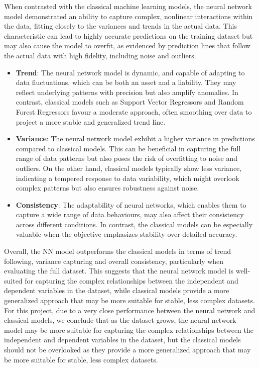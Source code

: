 When contrasted with the classical machine learning models, the neural network model demonstrated an ability to capture complex, nonlinear interactions within the data, fitting closely to the 
variances and trends in the actual data. This characteristic can lead to highly accurate predictions on the training dataset but may also cause the model to overfit, as evidenced by prediction 
lines that follow the actual data with high fidelity, including noise and outliers.

\begin{itemize}
    \item \textbf{Trend}: The neural network model is dynamic, and capable of adapting to data fluctuations, which can be both an asset and a liability. They may reflect underlying patterns with precision but also amplify 
    anomalies. In contrast, classical models such as Support Vector Regressors and Random Forest Regressors favour a moderate approach, often smoothing over data to project a more stable and generalized trend line.
    
    \item \textbf{Variance}: The neural network model exhibit a higher variance in predictions compared to classical models. This can be beneficial in capturing the full range of data patterns but 
    also poses the risk of overfitting to noise and outliers. On the other hand, classical models typically show less variance, indicating a tempered response to data variability, which might overlook 
    complex patterns but also ensures robustness against noise.

    \item \textbf{Consistency}: The adaptability of neural networks, which enables them to capture a wide range of data behaviours, may also affect their consistency across different conditions.
    In contrast, the classical models can be especially valuable when the objective emphasizes stability over detailed accuracy.
    

\end{itemize}


Overall, the NN model outperforms the classical models in terms of trend following, variance capturing and overall consistency, particularly when evaluating the full dataset. This suggests that 
the neural network model is well-suited for capturing the complex relationships between the independent and dependent variables in the dataset, while classical models provide a more generalized
approach that may be more suitable for stable, less complex datasets.
For this project, due to a very close performance between the neural network and classical models, we conclude that as the dataset grows, the neural network model may be more suitable for capturing
the complex relationships between the independent and dependent variables in the dataset, but the classical models should not be overlooked as they provide a more generalized approach that may
be more suitable for stable, less complex datasets.

